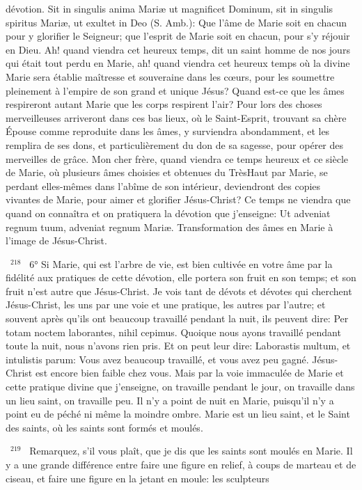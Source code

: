 \documentclass[paper=a5,pagesize=pdftex,fontsize=15pt,headinclude=on,twoside=off]{scrbook}
\newcommand{\negphantom}[1]{\settowidth{\dimen0}{#1}\hspace*{-\dimen0}}
\newcommand{\versenb}[1]{\par \vspace{10pt}~\negphantom{~${}^{#1}$~}${}^{#1}$~}
\begin{document}
dévotion. Sit in singulis anima Mariæ ut magnificet Dominum, sit in singulis spiritus Mariæ, ut exultet in Deo (S.
Amb.): Que l'âme de Marie soit en chacun pour y glorifier le Seigneur; que l'esprit de Marie soit en chacun, pour s'y
réjouir en Dieu. Ah! quand viendra cet heureux temps, dit un saint homme de nos jours qui était tout perdu en
Marie, ah! quand viendra cet heureux temps où la divine Marie sera établie maîtresse et souveraine dans les
cœurs, pour les soumettre pleinement à l'empire de son grand et unique Jésus? Quand est-ce que les âmes
respireront autant Marie que les corps respirent l'air? Pour lors des choses merveilleuses arriveront dans ces bas
lieux, où le Saint-Esprit, trouvant sa chère Épouse comme reproduite dans les âmes, y surviendra abondamment,
et les remplira de ses dons, et particulièrement du don de sa sagesse, pour opérer des merveilles de grâce. Mon
cher frère, quand viendra ce temps heureux et ce siècle de Marie, où plusieurs âmes choisies et obtenues du TrèsHaut par Marie, se perdant elles-mêmes dans l'abîme de son intérieur, deviendront des copies vivantes de Marie,
pour aimer et glorifier Jésus-Christ? Ce temps ne viendra que quand on connaîtra et on pratiquera la dévotion que
j'enseigne: Ut adveniat regnum tuum, adveniat regnum Mariæ.
Transformation des âmes en Marie à l'image de Jésus-Christ.
\versenb{218} 6° Si Marie, qui est l'arbre de vie, est bien cultivée en votre âme par la fidélité aux pratiques de cette
dévotion, elle portera son fruit en son temps; et son fruit n'est autre que Jésus-Christ. Je vois tant de dévots et
dévotes qui cherchent Jésus-Christ, les uns par une voie et une pratique, les autres par l'autre; et souvent après
qu'ils ont beaucoup travaillé pendant la nuit, ils peuvent dire: Per totam noctem laborantes, nihil cepimus. Quoique
nous ayons travaillé pendant toute la nuit, nous n'avons rien pris. Et on peut leur dire: Laborastis multum, et
intulistis parum: Vous avez beaucoup travaillé, et vous avez peu gagné. Jésus-Christ est encore bien faible chez
vous. Mais par la voie immaculée de Marie et cette pratique divine que j'enseigne, on travaille pendant le jour, on
travaille dans un lieu saint, on travaille peu. Il n'y a point de nuit en Marie, puisqu'il n'y a point eu de péché ni
même la moindre ombre. Marie est un lieu saint, et le Saint des saints, où les saints sont formés et moulés.
\versenb{219} Remarquez, s'il vous plaît, que je dis que les saints sont moulés en Marie. Il y a une grande différence entre
faire une figure en relief, à coups de marteau et de ciseau, et faire une figure en la jetant en moule: les sculpteurs
\end{document}
